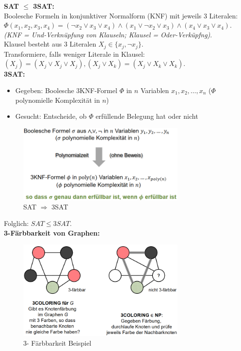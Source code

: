 \documentclass{article}
\begin{document}
                \textbf{SAT $\leq$ 3SAT:}\\
                Boolesche Formeln in konjunktiver Normalform (KNF) mit jeweils 3 Literalen: $\Phi(x_1,x_2,x_3,x_4)=(\lnot x_2 \vee x_3 \vee x_4)\wedge(x_1 \vee \lnot x_2 \vee x_3)\wedge(x_4 \vee x_3 \vee x_4)$.
                \textit{(KNF = Und-Verknüpfung von Klauseln; Klausel = Oder-Verküpfng)}. \\
                Klausel besteht aus 3 Literalen $X_j\in \{x_j,\lnot x_j\}$.\\
                Transformiere, falls weniger Literale in Klausel: $(X_j)=(X_j \vee X_j \vee X_j),(X_j \vee X_k)=(X_j \vee X_k \vee X_k)$.\\
                \textbf{3SAT:}
                \begin{itemize}
                    \item Gegeben: Boolesche 3KNF-Formel $\Phi$ in $n$ Variablen $x_1,x_2,\dots ,x_n$ ($\Phi$ polynomielle Komplexität in $n$)
                    \item Gesucht: Entscheide, ob $\Phi$ erfüllende Belegung hat oder nicht
                \end{itemize}
                \begin{figure}[ht]
                    \centering
                    \includegraphics[width=0.75\textwidth]{Bilder/SAT3.png}
                    \caption{SAT $\Rightarrow$ 3SAT}
                    \label{fig:SAT3}
                \end{figure}
                Folglich: $SAT \leq 3SAT$.\\
                \textbf{3-Färbbarkeit von Graphen:}
                \begin{figure}[ht]
                    \centering
                    \includegraphics[width=0.75\textwidth]{Bilder/3F.png}
                    \caption{3- Färbbarkeit Beispiel}
                    \label{fig:3F}
                \end{figure}\\
\end{document}
